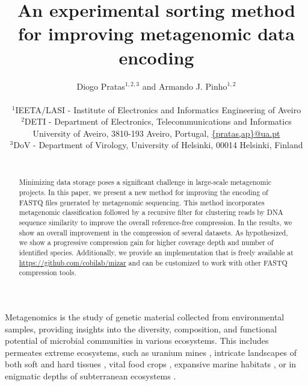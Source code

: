 \documentclass[smallabstract,smallcaptions]{dccpaper}
\begin{document}
\title
{\large
\textbf{An experimental sorting method\\ for improving metagenomic data encoding}
}


\author{%
Diogo Pratas$^{1,2,3}$ and Armando J. Pinho$^{1,2}$\\[0.5em]
{\small\begin{minipage}{\linewidth}\begin{center}
\begin{tabular}{ccc}
$^1$IEETA/LASI - Institute of Electronics and Informatics Engineering of Aveiro\\
$^2$DETI - Department of Electronics, Telecommunications and Informatics\\
University of Aveiro, 3810-193 Aveiro, Portugal, \url{{pratas,ap}@ua.pt} \\
$^3$DoV - Department of Virology, University of Helsinki, 00014 Helsinki, Finland\\
~
\end{tabular}
\end{center}\end{minipage}}
}


\maketitle
\thispagestyle{empty}


\begin{abstract}
Minimizing data storage poses a significant challenge in large-scale metagenomic projects. In this paper, we present a new method for improving the encoding of FASTQ files generated by metagenomic sequencing. This method incorporates metagenomic classification followed by a recursive filter for clustering reads by DNA sequence similarity to improve the overall reference-free compression. In the results, we show an overall improvement in the compression of several datasets. As hypothesized, we show a progressive compression gain for higher coverage depth and number of identified species. Additionally, we provide an implementation that is freely available at \url{https://github.com/cobilab/mizar} and can be customized to work with other FASTQ compression tools.
\end{abstract}


Metagenomics is the study of genetic material collected from environmental samples, providing insights into the diversity, composition, and functional potential of microbial communities in various ecosystems. This includes permeates extreme ecosystems, such as uranium mines \cite{covas2017pedobacter}, intricate landscapes of both soft and hard tissues \cite{pyoria2023unmasking,toppinen2020landscape}, vital food crops \cite{qi2022haplotype}, expansive marine habitats \cite{katsanevakis2016mapping}, or in enigmatic depths of subterranean ecosystems \cite{cowan2015metagenomics}.
\end{document}
